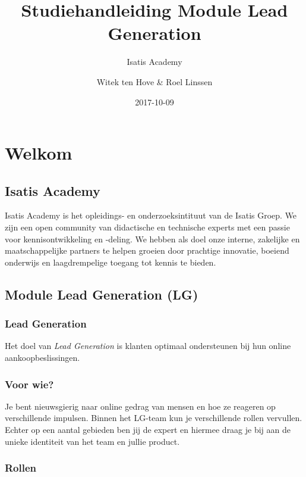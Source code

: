 \documentclass[]{book}
\title{Studiehandleiding Module Lead Generation}
\subtitle{Isatis Academy}
\author{Witek ten Hove \& Roel Linssen}
\date{2017-10-09}
\begin{document}
\maketitle

{
\setcounter{tocdepth}{1}
\tableofcontents
}
\chapter{Welkom}\label{welkom}

\section{Isatis Academy}\label{isatis-academy}

Isatis Academy is het opleidings- en onderzoeksintituut van de Isatis
Groep. We zijn een open community van didactische en technische experts
met een passie voor kennisontwikkeling en -deling. We hebben als doel
onze interne, zakelijke en maatschappelijke partners te helpen groeien
door prachtige innovatie, boeiend onderwijs en laagdrempelige toegang
tot kennis te bieden.

\section{Module Lead Generation (LG)}\label{module-lead-generation-lg}

\subsection{Lead Generation}\label{lead-generation}

Het doel van \emph{Lead Generation} is klanten optimaal ondersteunen bij
hun online aankoopbeslissingen.

\subsection{Voor wie?}\label{voor-wie}

Je bent nieuwsgierig naar online gedrag van mensen en hoe ze reageren op
verschillende impulsen. Binnen het LG-team kun je verschillende rollen
vervullen. Echter op een aantal gebieden ben jij de expert en hiermee
draag je bij aan de unieke identiteit van het team en jullie product.

\subsection{Rollen}\label{rollen}
\end{document}
